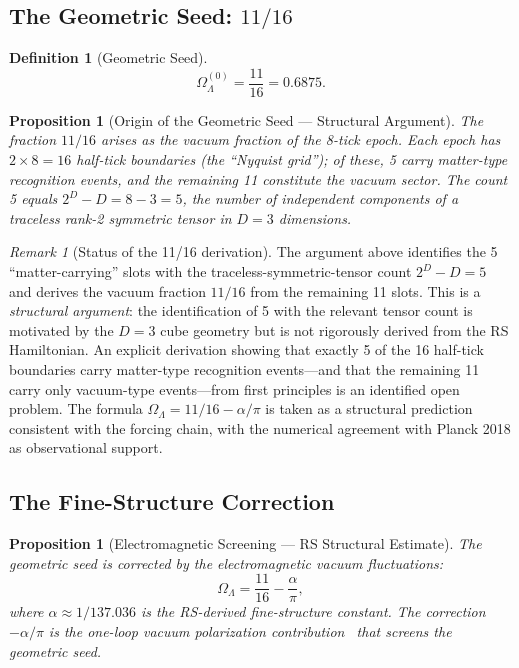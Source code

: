 \documentclass[12pt,a4paper]{article}
\newtheorem{proposition}[theorem]{Proposition}
\theoremstyle{definition}
\newtheorem{definition}[theorem]{Definition}
\theoremstyle{remark}
\newtheorem{remark}[theorem]{Remark}
\begin{document}
\subsection{The Geometric Seed: $11/16$}

\begin{definition}[Geometric Seed]
\begin{equation}
  \Omega_\Lambda^{(0)} = \frac{11}{16} = 0.6875.
\end{equation}
\end{definition}

\begin{proposition}[Origin of the Geometric Seed --- Structural Argument]
\label{thm:seed}
The fraction $11/16$ arises as the vacuum fraction of the 8-tick epoch.
Each epoch has $2 \times 8 = 16$ half-tick boundaries (the ``Nyquist
grid''); of these, 5 carry matter-type recognition events, and the
remaining 11 constitute the vacuum sector.  The count 5 equals
$2^D - D = 8 - 3 = 5$, the number of independent components of a
traceless rank-2 symmetric tensor in $D = 3$ dimensions.
\end{proposition}

\begin{remark}[Status of the 11/16 derivation]
\label{rem:11-16}
The argument above identifies the 5 ``matter-carrying'' slots with
the traceless-symmetric-tensor count $2^D - D = 5$ and derives the
vacuum fraction $11/16$ from the remaining 11 slots.  This is a
\emph{structural argument}: the identification of 5 with the
relevant tensor count is motivated by the $D = 3$ cube geometry
but is not rigorously derived from the RS Hamiltonian.  An explicit
derivation showing that exactly 5 of the 16 half-tick boundaries
carry matter-type recognition events---and that the remaining 11
carry only vacuum-type events---from first principles is an
identified open problem.  The formula $\Omega_\Lambda = 11/16 -
\alpha/\pi$ is taken as a structural prediction consistent with the
forcing chain, with the numerical agreement with Planck 2018 as
observational support.
\end{remark}

\subsection{The Fine-Structure Correction}

\begin{proposition}[Electromagnetic Screening --- RS Structural Estimate]
\label{thm:screening}
The geometric seed is corrected by the electromagnetic vacuum
fluctuations:
\begin{equation}
  \Omega_\Lambda = \frac{11}{16} - \frac{\alpha}{\pi},
\end{equation}
where $\alpha \approx 1/137.036$ is the RS-derived fine-structure
constant.  The correction $-\alpha/\pi$ is the one-loop vacuum
polarization contribution~\cite{Schwinger1948} that screens the
geometric seed.
\end{proposition}
\end{document}

